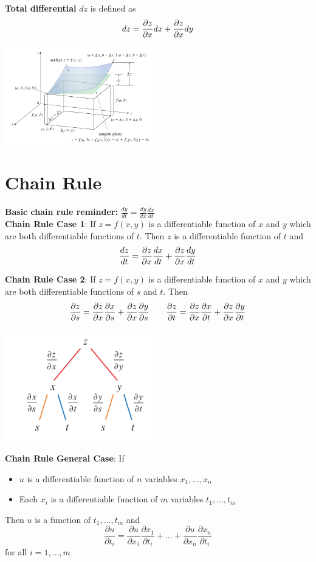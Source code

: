 \documentclass{report}
\begin{document}
\textbf{Total differential} $dz$ is defined as
\[
dz = \frac{\partial z}{\partial x} dx + \frac{\partial z}{\partial x} dy
\]

\begin{center}
    \includegraphics[width=0.5\textwidth]{images/differential.png}
\end{center}

\section{Chain Rule}

\textbf{Basic chain rule reminder:} $\frac{dy}{dt} = \frac{dy}{dx} \frac{dx}{dt}$
\\

\textbf{Chain Rule Case 1}: If $z = f(x, y)$ is a differentiable function of $x$ and $y$ which are 
both differentiable functions of $t$. Then $z$ is a differentiable function of $t$ and 
\[
\frac{dz}{dt} = \frac{\partial z}{\partial x} \frac{dx}{dt} + \frac{\partial z}{\partial x} \frac{dy}{dt}
\]

\textbf{Chain Rule Case 2}: If $z = f(x, y)$ is a differentiable function of $x$ and $y$ which are 
both differentiable functions of $s$ and $t$. Then 
\[
\frac{\partial z}{\partial s} = \frac{\partial z}{\partial x} \frac{\partial x}{\partial s} + \frac{\partial z}{\partial x} \frac{\partial y}{\partial s} \quad \quad \frac{\partial z}{\partial t} = \frac{\partial z}{\partial x} \frac{\partial x}{\partial t} + \frac{\partial z}{\partial x} \frac{\partial y}{\partial t}
\]

\begin{center}
    \includegraphics[width=0.5\textwidth]{images/chain.png}
\end{center}

\textbf{Chain Rule General Case}: If 
\begin{itemize}
    \item $u$ is a differentiable function of $n$ variables $x_1, \dots, x_n$
    \item Each $x_i$ is a differentiable function of $m$ variables $t_1, \dots, t_m$
\end{itemize}
Then $u$ is a function of $t_1, \dots, t_m$ and 
\[
\frac{\partial u}{\partial t_i} = \frac{\partial u}{\partial x_1} \frac{\partial x_1}{\partial t_i} + \dots + \frac{\partial u}{\partial x_n} \frac{\partial x_n}{\partial t_i}
\]
for all $i = 1, \dots, m$
\end{document}

